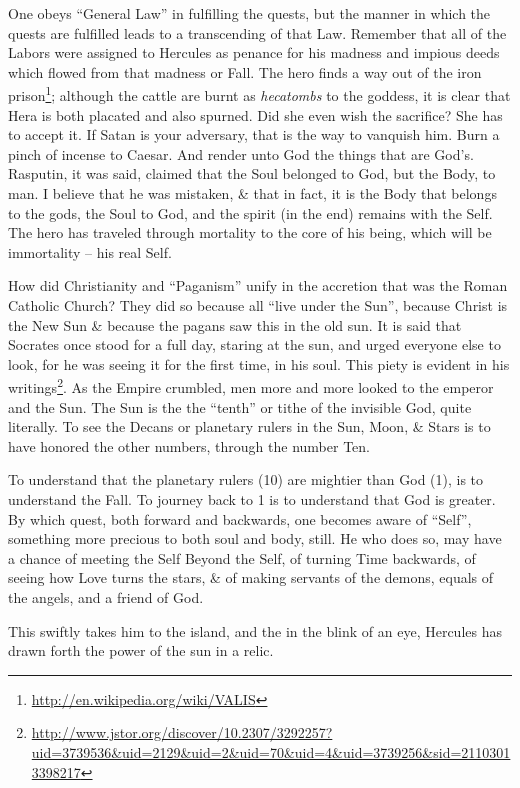 One obeys ``General Law'' in fulfilling the quests, but the manner in which the quests are fulfilled leads to a transcending of that Law. Remember that all of the Labors were assigned to Hercules as penance for his madness and impious deeds which flowed from that madness or Fall. The hero finds a way out of the iron prison\footnote{\url{http://en.wikipedia.org/wiki/VALIS}}; although the cattle are burnt as \emph{hecatombs} to the goddess, it is clear that Hera is both placated and also spurned. Did she even wish the sacrifice? She has to accept it. If Satan is your adversary, that is the way to vanquish him. Burn a pinch of incense to Caesar. And render unto God the things that are God's. Rasputin, it was said, claimed that the Soul belonged to God, but the Body, to man. I believe that he was mistaken, \&{} that in fact, it is the Body that belongs to the gods, the Soul to God, and the spirit (in the end) remains with the Self. The hero has traveled through mortality to the core of his being, which will be immortality -- his real Self.

How did Christianity and ``Paganism'' unify in the accretion that was the Roman Catholic Church? They did so because all ``live under the Sun'', because Christ is the New Sun \& because the pagans saw this in the old sun. It is said that Socrates once stood for a full day, staring at the sun, and urged everyone else to look, for he was seeing it for the first time, in his soul. This piety is evident in his writings\footnote{\url{http://www.jstor.org/discover/10.2307/3292257?uid=3739536&uid=2129&uid=2&uid=70&uid=4&uid=3739256&sid=21103013398217}}. As the Empire crumbled, men more and more looked to the emperor and the Sun. The Sun is the the ``tenth'' or tithe of the invisible God, quite literally. To see the Decans or planetary rulers in the Sun, Moon, \& Stars is to have honored the other numbers, through the number Ten.

To understand that the planetary rulers (10) are mightier than God (1), is to understand the Fall. To journey back to 1 is to understand that God is greater. By which quest, both forward and backwards, one becomes aware of ``Self'', something more precious to both soul and body, still. He who does so, may have a chance of meeting the Self Beyond the Self, of turning Time backwards, of seeing how Love turns the stars, \& of making servants of the demons, equals of the angels, and a friend of God.

This swiftly takes him to the island, and the in the blink of an eye, Hercules has drawn forth the power of the sun in a relic.


